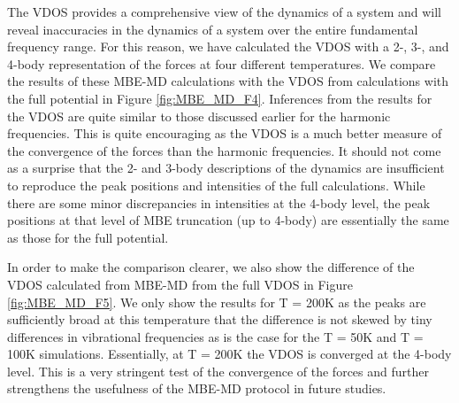 \documentclass[11pt, proquest]{uwthesis}[2020/02/24]
\begin{document}
\par The VDOS provides a comprehensive view of the dynamics of a system and will reveal inaccuracies in the dynamics of a system over the entire fundamental frequency range. For this reason, we have calculated the VDOS with a 2-, 3-, and 4-body representation of the forces at four different temperatures. We compare the results of these MBE-MD calculations with the VDOS from calculations with the full potential in Figure \ref{fig:MBE_MD_F4}. Inferences from the results for the VDOS are quite similar to those discussed earlier for the harmonic frequencies. This is quite encouraging as the VDOS is a much better measure of the convergence of the forces than the harmonic frequencies. It should not come as a surprise that the 2- and 3-body descriptions of the dynamics are insufficient to reproduce the peak positions and intensities of the full calculations. While there are some minor discrepancies in intensities at the 4-body level, the peak positions at that level of MBE truncation (up to 4-body) are essentially the same as those for the full potential.



\par In order to make the comparison clearer, we also show the difference of the VDOS calculated from MBE-MD from the full VDOS in Figure \ref{fig:MBE_MD_F5}. We only show the results for T = 200K as the peaks are sufficiently broad at this temperature that the difference is not skewed by tiny differences in vibrational frequencies as is the case for the T = 50K and T = 100K simulations. Essentially, at T = 200K the VDOS is converged at the 4-body level. This is a very stringent test of the convergence of the forces and further strengthens the usefulness of the MBE-MD protocol in future studies.
\end{document}
